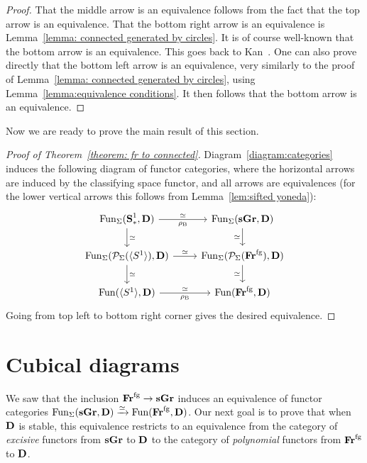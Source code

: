 \documentclass[psamsfonts]{amsart}
\theoremstyle{plain}
\theoremstyle{definition}
\theoremstyle{remark}
\newcommand{\catname}[1]{{\normalfont\textbf{#1}}}
\newcommand{\circles}{\langle S^1 \rangle}
\newcommand{\spaces}{\catname{S}_*}
\newcommand{\connected}{\spaces^{1}}
\newcommand{\fr}{\allfr^{\mathrm{fg}}}
\newcommand{\allfr}{\catname{Fr}}
\newcommand{\presh}{\mathcal{P}}
\newcommand{\sgr}{\catname{sGr}}
\newcommand{\classifying}{\operatorname{B}}
\DeclareMathOperator{\fun}{Fun}
\begin{document}
\begin{proof}
That the middle arrow is an equivalence follows from the fact that the top arrow is an equivalence. That the bottom right arrow is an equivalence is Lemma~\ref{lemma: connected generated by circles}. It is of course well-known that the bottom arrow is an equivalence. This goes back to Kan~\cite{KanLoop}. One can also prove directly that the bottom left arrow is an equivalence, very similarly to the proof of Lemma~\ref{lemma: connected generated by circles}, using Lemma~\ref{lemma:equivalence conditions}. It then follows that the bottom arrow is an equivalence.
\end{proof}
Now we are ready to prove the main result of this section.
\begin{proof}[Proof of Theorem~\ref{theorem: fr to connected}]
Diagram~\eqref{diagram:categories} induces the following diagram of functor categories, where the horizontal arrows are induced by the classifying space functor, and all arrows are equivalences (for the lower vertical arrows this follows from Lemma~\ref{lem:sifted yoneda}):
\begin{equation}\label{diagram:functors}
\begin{tikzcd}
	{\fun_{\Sigma}(\connected, \catname{D})} & {\fun_{\Sigma}( \sgr, \catname{D})} \\
	{\fun_{\Sigma}( \presh_{\Sigma}(\circles), \catname{D})} & {\fun_{\Sigma}( \presh_{\Sigma}(\fr), \catname{D})} \\
	{\fun(\circles, \catname{D})} & {\fun(\fr, \catname{D})}
	\arrow["\simeq"', swap, "\rho_{\classifying}", from=1-1, to=1-2]
	\arrow["\simeq", from=1-1, to=2-1]
	\arrow["\simeq"', from=1-2, to=2-2]
	\arrow["\simeq", from=2-1, to=2-2]
	\arrow["\simeq", from=2-1, to=3-1]
	\arrow["\simeq"', from=2-2, to=3-2]
	\arrow["\simeq"',  swap, "\rho_{\classifying}", from=3-1, to=3-2]
\end{tikzcd}
\end{equation}
Going from top left to bottom right corner gives the desired equivalence.
\end{proof}


\section{Cubical diagrams}\label{section:cubical}
We saw that the inclusion $\fr\to \sgr$ induces an equivalence of functor categories $\fun_{\Sigma}(\sgr, \catname{D})\xrightarrow{\simeq} \fun(\fr, \catname{D})$. Our next goal is to prove that when $\catname{D}$ is stable, this equivalence restricts to an equivalence from the category of \emph{excisive} functors from $\sgr$ to $\catname{D}$ to the category of \emph{polynomial} functors from $\fr$ to $\catname{D}$. 
\end{document}

